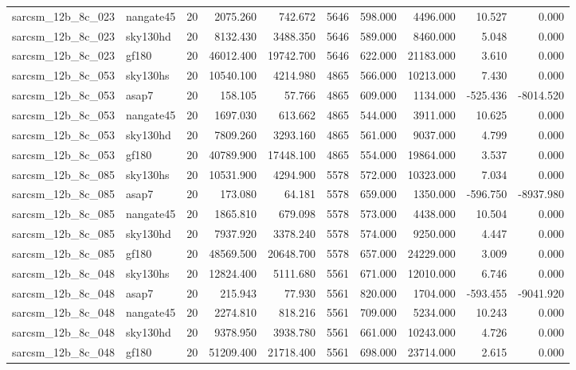 \documentclass{article}
\begin{document}
\begin{longtable}{llrrrrrrrr}
sarcsm\_12b\_8c\_023 & nangate45 & 20 & 2075.260 & 742.672 & 5646 & 598.000 & 4496.000 & 10.527 & 0.000 \\
sarcsm\_12b\_8c\_023 & sky130hd & 20 & 8132.430 & 3488.350 & 5646 & 589.000 & 8460.000 & 5.048 & 0.000 \\
sarcsm\_12b\_8c\_023 & gf180 & 20 & 46012.400 & 19742.700 & 5646 & 622.000 & 21183.000 & 3.610 & 0.000 \\
sarcsm\_12b\_8c\_053 & sky130hs & 20 & 10540.100 & 4214.980 & 4865 & 566.000 & 10213.000 & 7.430 & 0.000 \\
sarcsm\_12b\_8c\_053 & asap7 & 20 & 158.105 & 57.766 & 4865 & 609.000 & 1134.000 & -525.436 & -8014.520 \\
sarcsm\_12b\_8c\_053 & nangate45 & 20 & 1697.030 & 613.662 & 4865 & 544.000 & 3911.000 & 10.625 & 0.000 \\
sarcsm\_12b\_8c\_053 & sky130hd & 20 & 7809.260 & 3293.160 & 4865 & 561.000 & 9037.000 & 4.799 & 0.000 \\
sarcsm\_12b\_8c\_053 & gf180 & 20 & 40789.900 & 17448.100 & 4865 & 554.000 & 19864.000 & 3.537 & 0.000 \\
sarcsm\_12b\_8c\_085 & sky130hs & 20 & 10531.900 & 4294.900 & 5578 & 572.000 & 10323.000 & 7.034 & 0.000 \\
sarcsm\_12b\_8c\_085 & asap7 & 20 & 173.080 & 64.181 & 5578 & 659.000 & 1350.000 & -596.750 & -8937.980 \\
sarcsm\_12b\_8c\_085 & nangate45 & 20 & 1865.810 & 679.098 & 5578 & 573.000 & 4438.000 & 10.504 & 0.000 \\
sarcsm\_12b\_8c\_085 & sky130hd & 20 & 7937.920 & 3378.240 & 5578 & 574.000 & 9250.000 & 4.447 & 0.000 \\
sarcsm\_12b\_8c\_085 & gf180 & 20 & 48569.500 & 20648.700 & 5578 & 657.000 & 24229.000 & 3.009 & 0.000 \\
sarcsm\_12b\_8c\_048 & sky130hs & 20 & 12824.400 & 5111.680 & 5561 & 671.000 & 12010.000 & 6.746 & 0.000 \\
sarcsm\_12b\_8c\_048 & asap7 & 20 & 215.943 & 77.930 & 5561 & 820.000 & 1704.000 & -593.455 & -9041.920 \\
sarcsm\_12b\_8c\_048 & nangate45 & 20 & 2274.810 & 818.216 & 5561 & 709.000 & 5234.000 & 10.243 & 0.000 \\
sarcsm\_12b\_8c\_048 & sky130hd & 20 & 9378.950 & 3938.780 & 5561 & 661.000 & 10243.000 & 4.726 & 0.000 \\
sarcsm\_12b\_8c\_048 & gf180 & 20 & 51209.400 & 21718.400 & 5561 & 698.000 & 23714.000 & 2.615 & 0.000 \\

\end{longtable}
\end{document}
